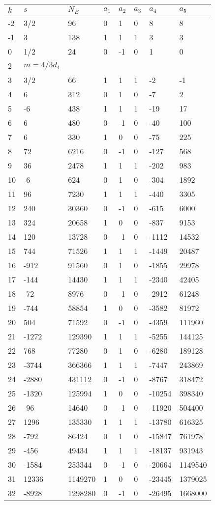 \documentclass{amsart}
\begin{document}
\begin{longtable}{|l|l|l|lllll|}
\hline
$k$ & $s$ & $N_E$ & $a_1$ & $a_2$ & $a_3$ & $a_4$ & $a_5$\\
\hline
-2&3/2&96&0&1&0&8&8\\
-1&3&138&1&1&1&3&3\\
0&1/2&24&0&-1&0&1&0\\
2&$m=4/3d_{4}$&&\multicolumn{5}{c|}{}\\
3&3/2&66&1&1&1&-2&-1\\
4&6&312&0&1&0&-7&2\\
5&-6&438&1&1&1&-19&17\\
6&6&480&0&-1&0&-40&100\\
7&6&330&1&0&0&-75&225\\
8&72&6216&0&-1&0&-127&568\\
9&36&2478&1&1&1&-202&983\\
10&-6&624&0&1&0&-304&1892\\
11&96&7230&1&1&1&-440&3305\\
12&240&30360&0&-1&0&-615&6000\\
13&324&20658&1&0&0&-837&9153\\
14&120&13728&0&-1&0&-1112&14532\\
15&744&71526&1&1&1&-1449&20487\\
16&-912&91560&0&1&0&-1855&29978\\
17&-144&14430&1&1&1&-2340&42405\\
18&-72&8976&0&-1&0&-2912&61248\\
19&-744&58854&1&0&0&-3582&81972\\
20&504&71592&0&-1&0&-4359&111960\\
21&-1272&129390&1&1&1&-5255&144125\\
22&768&77280&0&1&0&-6280&189128\\
23&-3744&366366&1&1&1&-7447&243869\\
24&-2880&431112&0&-1&0&-8767&318472\\
25&-1320&125994&1&0&0&-10254&398340\\
26&-96&14640&0&-1&0&-11920&504400\\
27&1296&135330&1&1&1&-13780&616325\\
28&-792&86424&0&1&0&-15847&761978\\
29&-456&49434&1&1&1&-18137&931943\\
30&-1584&253344&0&-1&0&-20664&1149540\\
31&12336&1149270&1&0&0&-23445&1379025\\
32&-8928&1298280&0&-1&0&-26495&1668000\\

\end{longtable}
\end{document}

